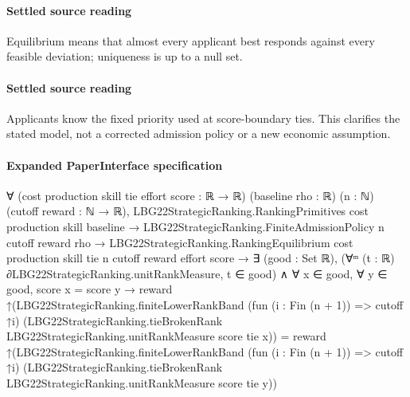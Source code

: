 \documentclass[10pt]{article}
\begin{document}
\paragraph{Settled source reading}
\begin{sloppypar}
Equilibrium means that almost every applicant best responds against every feasible deviation;\allowbreak{} uniqueness is up to a null set.\allowbreak{}
\end{sloppypar}
\paragraph{Settled source reading}
\begin{sloppypar}
Applicants know the fixed priority used at score-\allowbreak{}boundary ties.\allowbreak{} This clarifies the stated model, not a corrected admission policy or a new economic assumption.\allowbreak{}
\end{sloppypar}

\paragraph{Expanded PaperInterface specification}
\begin{ReviewVerbatim}
∀ (cost production skill tie effort score : ℝ → ℝ) (baseline rho : ℝ) (n : ℕ) (cutoff reward : ℕ → ℝ),
  LBG22StrategicRanking.RankingPrimitives cost production skill baseline →
    LBG22StrategicRanking.FiniteAdmissionPolicy n cutoff reward rho →
      LBG22StrategicRanking.RankingEquilibrium cost production skill tie n cutoff reward effort score →
        ∃ (good : Set ℝ),
          (∀ᵐ (t : ℝ) ∂LBG22StrategicRanking.unitRankMeasure, t ∈ good) ∧
            ∀ x ∈ good,
              ∀ y ∈ good,
                score x = score y →
                  reward
                      ↑(LBG22StrategicRanking.finiteLowerRankBand (fun (i : Fin (n + 1)) => cutoff ↑i)
                          (LBG22StrategicRanking.tieBrokenRank LBG22StrategicRanking.unitRankMeasure score tie x)) =
                    reward
                      ↑(LBG22StrategicRanking.finiteLowerRankBand (fun (i : Fin (n + 1)) => cutoff ↑i)
                          (LBG22StrategicRanking.tieBrokenRank LBG22StrategicRanking.unitRankMeasure score tie y))
\end{ReviewVerbatim}
\end{document}
